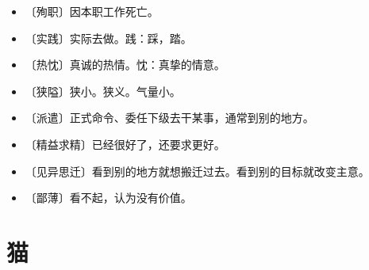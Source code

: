 \documentclass[12pt,UTF-8,openany]{ctexbook}
\begin{document}
\begin{itemize}
    \setlength\itemsep{-0.2em}
    \item 〔殉职〕因本职工作死亡。
    \item 〔实践〕实际去做。践：踩，踏。
    \item 〔热忱〕真诚的热情。忱：真挚的情意。
    \item 〔狭隘〕狭小。狭义。气量小。
    \item 〔派遣〕正式命令、委任下级去干某事，通常到别的地方。
    \item 〔精益求精〕已经很好了，还要求更好。
    \item 〔见异思迁〕看到别的地方就想搬迁过去。看到别的目标就改变主意。
    \item 〔鄙薄〕看不起，认为没有价值。
\end{itemize}

\chapter{猫}
\end{document}
